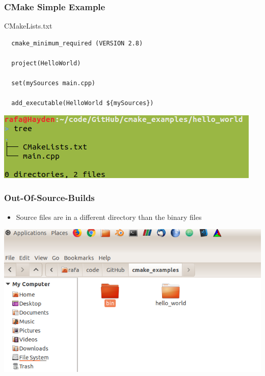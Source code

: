 \begin{frame}[fragile]
  \frametitle{CMake Simple Example}
  \vspace{-0.5cm}

  \begin{block}{CMakeLists.txt}
\begin{verbatim}
  cmake_minimum_required (VERSION 2.8)

  project(HelloWorld)

  set(mySources main.cpp)

  add_executable(HelloWorld ${mySources})

\end{verbatim}
\end{block}

\begin{center}
\includegraphics[width=0.8 \textwidth]{img/source-tree.png}
\end{center}

\end{frame}

\begin{frame}
  \frametitle{Out-Of-Source-Builds}
  \begin{itemize}
    \item Source files are in a different directory than the binary files 
  \end{itemize}

  \begin{center}
    \includegraphics[width=0.8 \textwidth]{img/source-bin.png}
  \end{center}

\end{frame}

